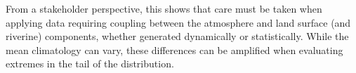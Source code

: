 \documentclass[draft]{agujournal2019}
\begin{document}
From a stakeholder perspective, this shows that care must be taken when applying data requiring coupling between the atmosphere and land surface (and riverine) components, whether generated dynamically or statistically. While the mean climatology can vary, these differences can be amplified when evaluating extremes in the tail of the distribution.







%
%
%
%
%
%
%
%
%
%
\end{document}
